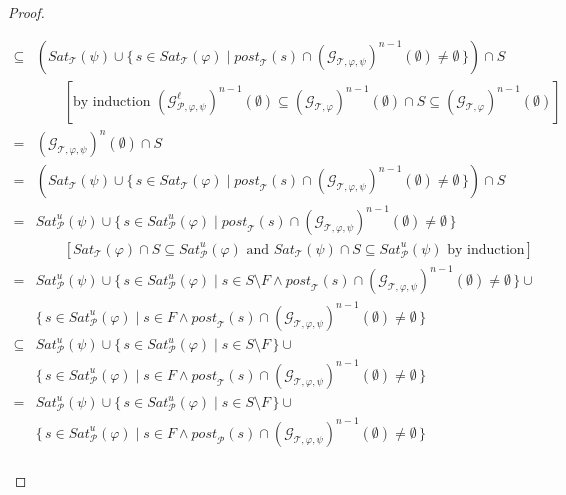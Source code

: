 \documentclass[12pt]{article}
\theoremstyle{definition}
\newcommand{\comment}[1]{\hspace{2em}[\mbox{#1}]}
\begin{document}
\begin{proof}
\begin{itemize}
\begin{align*}
\subseteq & (\mathit{Sat}_{\mathcal{T}}(\psi) \cup \{\, s \in \mathit{Sat}_{\mathcal{T}}(\varphi) \mid \mathit{post}_{\mathcal{T}}(s) \cap (\mathcal{G}_{\mathcal{T}, \varphi, \psi})^{n-1}(\emptyset) \not= \emptyset \,\}) \cap S\\
& \comment{by induction $(\mathcal{G}_{\mathcal{P}, \varphi, \psi}^{\ell})^{n-1}(\emptyset)
\subseteq (\mathcal{G}_{\mathcal{T}, \varphi})^{n-1}(\emptyset) \cap S \subseteq (\mathcal{G}_{\mathcal{T}, \varphi})^{n-1}(\emptyset)$}\\
= & (\mathcal{G}_{\mathcal{T}, \varphi, \psi})^{n}(\emptyset) \cap S\\
= & (\mathit{Sat}_{\mathcal{T}}(\psi) \cup \{\, s \in \mathit{Sat}_{\mathcal{T}}(\varphi) \mid \mathit{post}_{\mathcal{T}}(s) \cap (\mathcal{G}_{\mathcal{T}, \varphi, \psi})^{n-1}(\emptyset) \not= \emptyset \,\}) \cap S\\
= & \mathit{Sat}_{\mathcal{P}}^u(\psi) \cup \{\, s \in \mathit{Sat}_{\mathcal{P}}^u(\varphi) \mid \mathit{post}_{\mathcal{T}}(s) \cap (\mathcal{G}_{\mathcal{T}, \varphi, \psi})^{n-1}(\emptyset) \not= \emptyset \,\}\\
& \comment{$\mathit{Sat}_{\mathcal{T}}(\varphi) \cap S \subseteq \mathit{Sat}^u_{\mathcal{P}}(\varphi)$ and $\mathit{Sat}_{\mathcal{T}}(\psi) \cap S \subseteq \mathit{Sat}^u_{\mathcal{P}}(\psi)$ by induction}\\
= & \mathit{Sat}_{\mathcal{P}}^u(\psi) \cup \{\, s \in \mathit{Sat}_{\mathcal{P}}^u(\varphi) \mid s \in S \setminus F \wedge \mathit{post}_{\mathcal{T}}(s) \cap (\mathcal{G}_{\mathcal{T}, \varphi, \psi})^{n-1}(\emptyset) \not= \emptyset \,\} \cup\\
& \{\, s \in \mathit{Sat}_{\mathcal{P}}^u(\varphi) \mid s \in F \wedge \mathit{post}_{\mathcal{T}}(s) \cap (\mathcal{G}_{\mathcal{T}, \varphi, \psi})^{n-1}(\emptyset) \not= \emptyset \,\}\\
\subseteq & \mathit{Sat}_{\mathcal{P}}^u(\psi) \cup \{\, s \in \mathit{Sat}_{\mathcal{P}}^u(\varphi) \mid s \in S \setminus F \,\} \cup\\
& \{\, s \in \mathit{Sat}_{\mathcal{P}}^u(\varphi) \mid s \in F \wedge \mathit{post}_{\mathcal{T}}(s) \cap (\mathcal{G}_{\mathcal{T}, \varphi, \psi})^{n-1}(\emptyset) \not= \emptyset \,\}\\
= & \mathit{Sat}_{\mathcal{P}}^u(\psi) \cup \{\, s \in \mathit{Sat}_{\mathcal{P}}^u(\varphi) \mid s \in S \setminus F \,\} \cup\\
& \{\, s \in \mathit{Sat}_{\mathcal{P}}^u(\varphi) \mid s \in F \wedge \mathit{post}_{\mathcal{P}}(s) \cap (\mathcal{G}_{\mathcal{T}, \varphi, \psi})^{n-1}(\emptyset) \not= \emptyset \,\}\\

\end{align*}
\end{itemize}
\end{proof}
\end{document}
